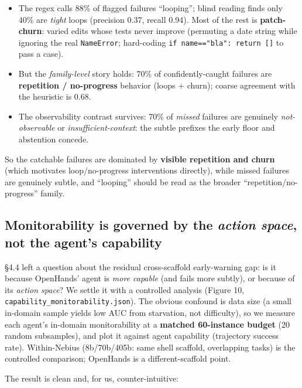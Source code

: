 \begin{itemize}
\item The regex calls 88\% of flagged failures ``looping''; blind reading finds only 40\% are \emph{tight} loops (precision 0.37, recall 0.94). Most of the rest is \textbf{patch-churn}: varied edits whose tests never improve (permuting a date string while ignoring the real \texttt{NameError}; hard-coding \texttt{if name=="bla": return []} to pass a case).
\item But the \emph{family-level} story holds: 70\% of confidently-caught failures are \textbf{repetition / no-progress} behavior (loops + churn); coarse agreement with the heuristic is 0.68.
\item The observability contrast survives: 70\% of \emph{missed} failures are genuinely \emph{not-observable} or \emph{insufficient-context}: the subtle prefixes the early floor and abstention concede.
\end{itemize}
So the catchable failures are dominated by \textbf{visible repetition and churn} (which motivates loop/no-progress interventions directly), while missed failures are genuinely subtle, and ``looping'' should be read as the broader ``repetition/no-progress'' family.

\subsection{Monitorability is governed by the \emph{action space}, not the agent's capability}
\S4.4 left a question about the residual cross-scaffold early-warning gap: is it because OpenHands' agent is \emph{more capable} (and fails more subtly), or because of its \emph{action space}? We settle it with a controlled analysis (Figure 10, \texttt{capability\_monitorability.json}). The obvious confound is data size (a small in-domain sample yields low AUC from starvation, not difficulty), so we measure each agent's in-domain monitorability at a \textbf{matched 60-instance budget} (20 random subsamples), and plot it against agent capability (trajectory success rate). Within-Nebius (8b/70b/405b: same shell scaffold, overlapping tasks) is the controlled comparison; OpenHands is a different-scaffold point.

The result is clean and, for us, counter-intuitive:


